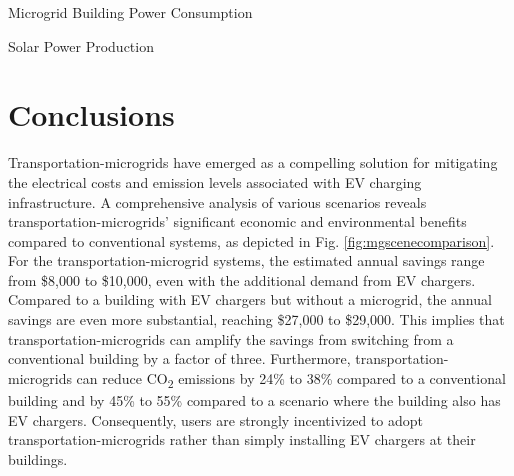 \documentclass[conference]{IEEEtran}
\begin{document}
	\begin{table}
		\caption{Microgrid Building Power Consumption}
		\tiny
		\centering
		
		\normalsize
		\label{tab:load_level_2_level_3.tex}
	\end{table}	
	\begin{table}
		\caption{Solar Power Production}
		\tiny
		\centering
		
		\normalsize
		\label{tab:mg_gen_level_2_level_3}
	\end{table}	
	\section{Conclusions}
		Transportation-microgrids have emerged as a compelling solution for mitigating the electrical costs and emission levels associated with EV charging infrastructure. A comprehensive analysis of various scenarios reveals transportation-microgrids' significant economic and environmental benefits compared to conventional systems, as depicted in Fig. \ref{fig:mgscenecomparison}. For the transportation-microgrid systems, the estimated annual savings range from \$8,000 to \$10,000, even with the additional demand from EV chargers. Compared to a building with EV chargers but without a microgrid, the annual savings are even more substantial, reaching \$27,000 to \$29,000. This implies that transportation-microgrids can amplify the savings from switching from a conventional building by a factor of three. Furthermore, transportation-microgrids can reduce CO\textsubscript{2} emissions by 24\% to 38\% compared to a conventional building and by 45\% to 55\% compared to a scenario where the building also has EV chargers. Consequently, users are strongly incentivized to adopt transportation-microgrids rather than simply installing EV chargers at their buildings. 
		
\end{document}
